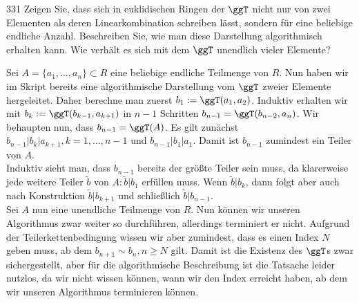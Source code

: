 \begin{algebraUE}{331}
Zeigen Sie, dass sich in euklidischen Ringen der $\ggT$ nicht nur von zwei
Elementen als deren Linearkombination schreiben lässt, sondern für eine
beliebige endliche Anzahl. Beschreiben Sie, wie man diese Darstellung
algorithmisch erhalten kann. Wie verhält es sich mit dem $\ggT$ unendlich
vieler Elemente?
\end{algebraUE}
\begin{solution}
Sei $A = \{a_1,\dots,a_n\} \subset R$ eine beliebige endliche Teilmenge von $R$.
Nun haben wir im Skript bereits eine algorithmische Darstellung vom
$\ggT$ zweier Elemente hergeleitet.
Daher berechne man zuerst $b_1 := \ggT(a_1,a_2)$.
Induktiv erhalten wir mit $b_k := \ggT(b_{k-1},a_{k+1})$
in $n - 1$ Schritten $b_{n-1} = \ggT(b_{n-2},a_{n})$.
Wir behaupten nun, dass $b_{n-1} = \ggT(A)$.
Es gilt zunächst $b_{n-1} | b_k | a_{k+1}, k = 1,\dots,n-1$ und $b_{n-1} | b_1 | a_1$.
Damit ist $b_{n-1}$ zumindest ein Teiler von $A$. \\
Induktiv sieht man, dass $b_{n-1}$ bereits der größte Teiler sein muss,
da klarerweise jede weitere Teiler $\widetilde{b}$ von $A: \widetilde{b} | b_1$
erfüllen muss.
Wenn $\widetilde{b} | b_k$, dann folgt aber auch nach Konstruktion $\widetilde{b} | b_{k+1}$
und schließlich $\widetilde{b} | b_{n-1}$. \\
Sei $A$ nun eine unendliche Teilmenge von $R$. Nun können wir unseren Algorithmus
zwar weiter so durchführen, allerdings terminiert er nicht.
Aufgrund der Teilerkettenbedingung wissen wir aber zumindest, dass es einen
Index $N$ geben muss, ab dem $b_{n+1} \sim b_{n}, n \geq N$ gilt.
Damit ist die Existenz des $\ggT$s zwar sichergestellt,
aber für die algorithmische Beschreibung ist die Tatsache leider nutzlos, da
wir nicht wissen können, wann wir den Index erreicht haben, ab dem wir
unseren Algorithmus terminieren können.
\end{solution}
